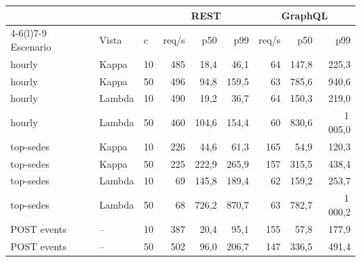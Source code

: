 \begin{tabular}{@{}lllrrrrrr@{}}
\toprule
& & & \multicolumn{3}{c}{REST} & \multicolumn{3}{c}{GraphQL} \\
\cmidrule(lr){4-6}\cmidrule(l){7-9}
Escenario & Vista & $c$ & req/s & p50 & p99 & req/s & p50 & p99 \\
\midrule
hourly & Kappa & 10 & 485 & 18,4 & 46,1 & 64 & 147,8 & 225,3 \\
hourly & Kappa & 50 & 496 & 94,8 & 159,5 & 63 & 785,6 & 940,6 \\
hourly & Lambda & 10 & 490 & 19,2 & 36,7 & 64 & 150,3 & 219,0 \\
hourly & Lambda & 50 & 460 & 104,6 & 154,4 & 60 & 830,6 & 1\,005,0 \\
top-sedes & Kappa & 10 & 226 & 44,6 & 61,3 & 165 & 54,9 & 120,3 \\
top-sedes & Kappa & 50 & 225 & 222,9 & 265,9 & 157 & 315,5 & 438,4 \\
top-sedes & Lambda & 10 & 69 & 145,8 & 189,4 & 62 & 159,2 & 253,7 \\
top-sedes & Lambda & 50 & 68 & 726,2 & 870,7 & 63 & 782,7 & 1\,000,2 \\
POST events & -- & 10 & 387 & 20,4 & 95,1 & 155 & 57,8 & 177,9 \\
POST events & -- & 50 & 502 & 96,0 & 206,7 & 147 & 336,5 & 491,4 \\
\bottomrule
\end{tabular}
